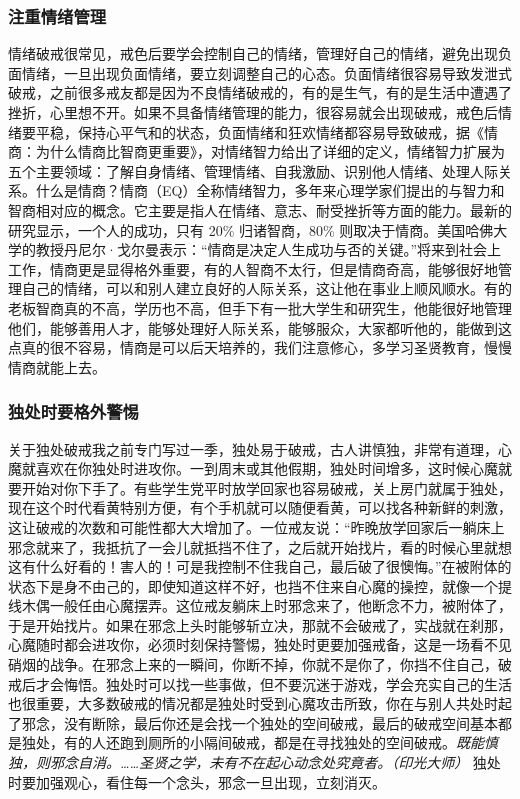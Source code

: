 \subsubsection{注重情绪管理}

情绪破戒很常见，戒色后要学会控制自己的情绪，管理好自己的情绪，避免出现负面情绪，一旦出现负面情绪，要立刻调整自己的心态。负面情绪很容易导致发泄式破戒，之前很多戒友都是因为不良情绪破戒的，有的是生气，有的是生活中遭遇了挫折，心里想不开。如果不具备情绪管理的能力，很容易就会出现破戒，戒色后情绪要平稳，保持心平气和的状态，负面情绪和狂欢情绪都容易导致破戒，据《情商：为什么情商比智商更重要》，对情绪智力给出了详细的定义，情绪智力扩展为五个主要领域：了解自身情绪、管理情绪、自我激励、识别他人情绪、处理人际关系。什么是情商？情商（EQ）全称情绪智力，多年来心理学家们提出的与智力和智商相对应的概念。它主要是指人在情绪、意志、耐受挫折等方面的能力。最新的研究显示，一个人的成功，只有 20\% 归诸智商，80\% 则取决于情商。美国哈佛大学的教授丹尼尔·戈尔曼表示：“情商是决定人生成功与否的关键。”将来到社会上工作，情商更是显得格外重要，有的人智商不太行，但是情商奇高，能够很好地管理自己的情绪，可以和别人建立良好的人际关系，这让他在事业上顺风顺水。有的老板智商真的不高，学历也不高，但手下有一批大学生和研究生，他能很好地管理他们，能够善用人才，能够处理好人际关系，能够服众，大家都听他的，能做到这点真的很不容易，情商是可以后天培养的，我们注意修心，多学习圣贤教育，慢慢情商就能上去。

\subsubsection{独处时要格外警惕}

关于独处破戒我之前专门写过一季，独处易于破戒，古人讲慎独，非常有道理，心魔就喜欢在你独处时进攻你。一到周末或其他假期，独处时间增多，这时候心魔就要开始对你下手了。有些学生党平时放学回家也容易破戒，关上房门就属于独处，现在这个时代看黄特别方便，有个手机就可以随便看黄，可以找各种新鲜的刺激，这让破戒的次数和可能性都大大增加了。一位戒友说：“昨晚放学回家后一躺床上邪念就来了，我抵抗了一会儿就抵挡不住了，之后就开始找片，看的时候心里就想这有什么好看的！害人的！可是我控制不住我自己，最后破了很懊悔。”在被附体的状态下是身不由己的，即使知道这样不好，也挡不住来自心魔的操控，就像一个提线木偶一般任由心魔摆弄。这位戒友躺床上时邪念来了，他断念不力，被附体了，于是开始找片。如果在邪念上头时能够斩立决，那就不会破戒了，实战就在刹那，心魔随时都会进攻你，必须时刻保持警惕，独处时更要加强戒备，这是一场看不见硝烟的战争。在邪念上来的一瞬间，你断不掉，你就不是你了，你挡不住自己，破戒后才会悔悟。独处时可以找一些事做，但不要沉迷于游戏，学会充实自己的生活也很重要，大多数破戒的情况都是独处时受到心魔攻击所致，你在与别人共处时起了邪念，没有断除，最后你还是会找一个独处的空间破戒，最后的破戒空间基本都是独处，有的人还跑到厕所的小隔间破戒，都是在寻找独处的空间破戒。\textit{既能慎独，则邪念自消。……圣贤之学，未有不在起心动念处究竟者。（印光大师）} 独处时要加强观心，看住每一个念头，邪念一旦出现，立刻消灭。

